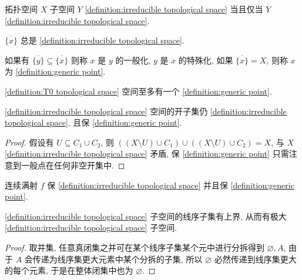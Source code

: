 \begin{lemma}
    拓扑空间 \(X\) 子空间 \(Y\) \ref{definition:irreducible topological space} 当且仅当 \(\overline{Y}\) \ref{definition:irreducible topological space}.
\end{lemma}

\begin{lemma}
    \(\overline{\{x\}}\) 总是 \ref{definition:irreducible topological space}.
\end{lemma}

\begin{definition}
    \label {definition:generic point}
    如果有 \(\overline{\{y\}} \subseteq \overline{\{x\}}\) 则称 \(x\) 是 \(y\) 的一般化,
    \(y\) 是 \(x\) 的特殊化, 如果 \(\overline{\{x\}} = X\), 则称 \(x\) 为 \ref{definition:generic point}.
\end{definition}

\begin{corollary}
    \ref{definition:T0 topological space} 空间至多有一个 \ref{definition:generic point}.
\end{corollary}

\begin{lemma}
    \ref{definition:irreducible topological space} 空间的开子集仍 \ref{definition:irreducible topological space},
    且保 \ref{definition:generic point}.

    \begin{proof}
        假设有 \(U \subseteq C_1 \cup C_2\), 则 \(((X \setminus U) \cup C_1) \cup ((X \setminus U) \cup C_2) = X\), 
        与 \(X\) \ref{definition:irreducible topological space} 矛盾, 保 \ref{definition:generic point} 只需注意到一般点在任何非空开集中.
    \end{proof}
\end{lemma}

\begin{lemma}
    连续满射 \(f\) 保 \ref{definition:irreducible topological space} 并且保 \ref{definition:generic point}.
\end{lemma}

\begin{lemma}
    \ref{definition:irreducible topological space} 子空间的线序子集有上界, 从而有极大 \ref{definition:irreducible topological space} 子空间.

    \begin{proof}
        取并集, 任意真闭集之并可在某个线序子集某个元中进行分拆得到 \(\varnothing,A\), 由于 \(A\) 会传递为线序集更大元素中某个分拆的子集,
        所以 \(\varnothing\) 必然传递到线序集更大的每个元素, 于是在整体闭集中也为 \(\varnothing\).
    \end{proof}
\end{lemma}

